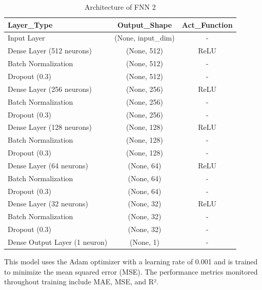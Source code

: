 \begin{table}[h!]
\centering
\caption{Architecture of FNN 2}
\begin{tabular}{|l|c|c|}
\hline
\textbf{Layer\_Type} & \textbf{Output\_Shape} & \textbf{Act\_Function} \\ \hline
Input Layer & (None, input\_dim) & - \\ \hline
Dense Layer (512 neurons) & (None, 512) & ReLU \\ \hline
Batch Normalization & (None, 512) & - \\ \hline
Dropout (0.3) & (None, 512) & - \\ \hline
Dense Layer (256 neurons) & (None, 256) & ReLU \\ \hline
Batch Normalization & (None, 256) & - \\ \hline
Dropout (0.3) & (None, 256) & - \\ \hline
Dense Layer (128 neurons) & (None, 128) & ReLU \\ \hline
Batch Normalization & (None, 128) & - \\ \hline
Dropout (0.3) & (None, 128) & - \\ \hline
Dense Layer (64 neurons) & (None, 64) & ReLU \\ \hline
Batch Normalization & (None, 64) & - \\ \hline
Dropout (0.3) & (None, 64) & - \\ \hline
Dense Layer (32 neurons) & (None, 32) & ReLU \\ \hline
Batch Normalization & (None, 32) & - \\ \hline
Dropout (0.3) & (None, 32) & - \\ \hline
Dense Output Layer (1 neuron) & (None, 1) & - \\ \hline
\end{tabular}
\label{tab:fnn2_architecture}
\end{table}

This model uses the Adam optimizer with a learning rate of 0.001 and is trained to minimize the mean squared error (MSE). The performance metrics monitored throughout training include MAE, MSE, and R².

